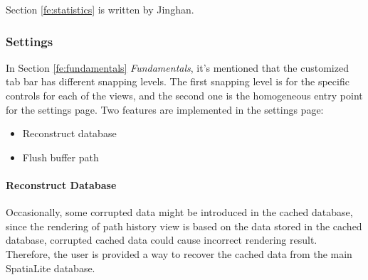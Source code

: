 \documentclass[12pt,a4paper]{article}
\begin{document}
            \footnotesize
            Section \ref{fe:statistics} is written by Jinghan.
            \normalsize
            
            \subsubsection{Settings} %
            \label{fe:settings}
            In Section \ref{fe:fundamentals} \textit{Fundamentals}, it's mentioned that the customized tab bar has different snapping levels. The first snapping level is for the specific controls for each of the views, and the second one is the homogeneous entry point for the settings page. Two features are implemented in the settings page:
            \begin{itemize}
                \setlength\itemsep{-0.5em}
                \item Reconstruct database
                \item Flush buffer path
            \end{itemize}
            \paragraph{Reconstruct Database}
            Occasionally, some corrupted data might be introduced in the cached database, since the rendering of path history view is based on the data stored in the cached database, corrupted cached data could cause incorrect rendering result. Therefore, the user is provided a way to recover the cached data from the main SpatiaLite database.
        
\end{document}
